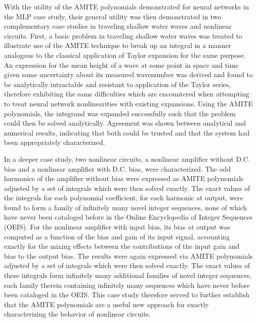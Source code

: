 With the utility of the AMITE polynomials demonstrated for neural networks in the MLP case study, their general utility was then demonstrated in two complementary case studies in traveling shallow water waves and nonlinear circuits.  First, a basic problem in traveling shallow water waves was treated to illustrate use of the AMITE technique to break up an integral in a manner analogous to the classical application of Taylor expansion for the same purpose.  An expression for the mean height of a wave at some point in space and time given some uncertainty about its measured wavenumber was derived and found to be analytically intractable and resistant to application of the Taylor series, therefore exhibiting the same difficulties which are encountered when attempting to treat neural network nonlinearities with existing expansions.  Using the AMITE polynomials, the integrand was expanded successfully such that the problem could then be solved analytically.  Agreement was shown between analytical and numerical results, indicating that both could be trusted and that the system had been appropriately characterized.

In a deeper case study, two nonlinear circuits, a nonlinear amplifier without D.C. bias and a nonlinear amplifier with D.C. bias, were characterized.  The odd harmonics of the amplifier without bias were expressed as AMITE polynomials adjusted by a set of integrals which were then solved exactly.  The exact values of the integrals for each polynomial coefficient, for each harmonic at output, were found to form a family of infinitely many novel integer sequences, none of which have never been cataloged before in the Online Encyclopedia of Integer Sequences (OEIS). For the nonlinear amplifier with input bias, its bias at output was computed as a function of the bias and gain of its input signal, accounting exactly for the mixing effects between the contributions of the input gain and bias to the output bias.  The results were again expressed via AMITE polynomials adjusted by a set of integrals which were then solved exactly.  The exact values of these integrals form infinitely many additional families of novel integer sequences, each family therein containing infinitely many sequences which have never before been cataloged in the OEIS.  This case study therefore served to further establish that the AMITE polynomials are a useful new approach for exactly characterizing the behavior of nonlinear circuits.

